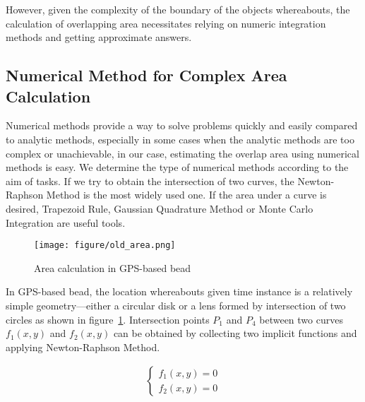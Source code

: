 \begin{comment}
\begin{comment}
\begin{equation} \label{integral}
P_{inside}(B, R, t) =\int_{UR_t \cap R}f(x,y,t)dxdy \\
= \frac{Area\mbox{ }of\mbox{ }{\textit{UR_t}}\mbox{ }that\mbox{ }overlaps\mbox{ }R}{Area\mbox{ }of\mbox{ }\{textit{UR_t}}}
\end{equation}
\end{comment}


However, given the complexity of the boundary of the objects whereabouts, the calculation of overlapping area necessitates relying on numeric 
integration methods and getting approximate answers.


\subsection{Numerical Method for Complex Area Calculation}




Numerical methods provide a way to solve problems quickly and easily compared to analytic methods, especially in some cases when the analytic 
methods are too complex or
unachievable, in our case, estimating the overlap area using numerical methods is easy. We determine the type of numerical methods according to the 
aim of tasks.
If we try to obtain the intersection of two curves, the Newton-Raphson Method
is the most widely used one. If the area under a curve is desired, Trapezoid Rule, Gaussian
Quadrature Method or Monte Carlo Integration are useful tools.
\begin{figure}
    \centering
    \texttt{[image: figure/old\_area.png]}
    \caption{Area calculation in GPS-based bead}
    \label{old_area}
\end{figure}
In GPS-based bead, the location whereabouts given time instance is a relatively simple
geometry---either a circular disk or a lens formed by intersection of two circles as
shown in figure~\ref{old_area}. Intersection points $P_1$ and $P_4$ between two curves
$f_1(x, y)$ and $f_2(x, y)$ can be obtained by collecting two implicit functions and applying
Newton-Raphson Method.

\begin{align}
\begin{cases}
f_1(x, y)=0\\
f_2(x, y)=0
\label{equset1}
\end{cases}
\end{align}

